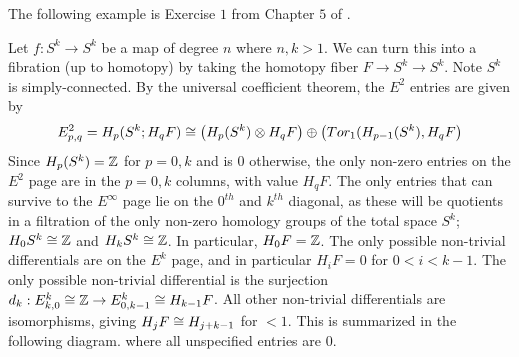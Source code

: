The following example is Exercise $1$ from Chapter $5$ of \cite{Hatcher-spec}.
\begin{example}
Let $f:S^k\rightarrow S^k$ be a map of degree $n$ where $n,k>1$. We can turn this into a fibration (up to homotopy) by taking the homotopy fiber $F\rightarrow S^k\rightarrow S^k$. Note $S^k$ is simply-connected. By the universal coefficient theorem, the $E^2$ entries are given by
$$E_{p,q}^2=H_p(S^k;H_qF)\cong \big(H_p(S^k)\otimes H_qF\big)\oplus\big(Tor_1(H_{p-1}(S^k),H_qF\big)$$
Since $H_p(S^k)=\mathbb{Z}$ for $p=0,k$ and is $0$ otherwise, the only non-zero entries on the $E^2$ page are in the $p=0,k$ columns, with value $H_qF$. The only entries that can survive to the $E^\infty$ page lie on the $0^{th}$ and $k^{th}$ diagonal, as these will be quotients in a filtration of the only non-zero homology groups of the total space $S^k$; $H_0S^k\cong \mathbb{Z}$ and $H_kS^k\cong \mathbb{Z}$. In particular, $H_0F=\mathbb{Z}$. The only possible non-trivial differentials are on the $E^k$ page, and in particular $H_iF=0$ for $0<i<k-1$. The only possible non-trivial differential is the surjection $d_k:E_{k,0}^k\cong \mathbb{Z}\rightarrow E^k_{0,k-1}\cong H_{k-1}F$. All other non-trivial differentials are isomorphisms, giving $H_jF\cong H_{j+k-1}$ for $<1$. This is summarized in the following diagram. where all unspecified entries are $0$.


\end{example}

